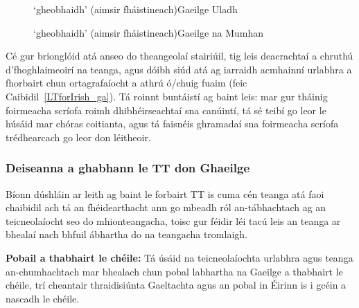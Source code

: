 \begin{multicols}{2}
\begin{description}
\item [{\rm \begin{IPA}j\super jo: i\end{IPA}}]  `gheobhaidh’  (aimsir fháistineach)\newline Gaeilge Uladh
\item [{\rm \begin{IPA}g\super jo: g\super j\end{IPA}} ]  `gheobhaidh’  (aimsir fháistineach)\newline Gaeilge na Mumhan
\end{description}

Cé gur brionglóid atá anseo do theangeolaí stairiúil, tig leis deacrachtaí a chruthú d’fhoghlaimeoirí na teanga, agus dóibh siúd atá ag iarraidh acmhainní urlabhra a fhorbairt chun ortagrafaíocht a athrú ó/chuig fuaim (feic Caibidil~\ref{LTforIrish_ga}).  Tá roinnt buntáistí ag baint leis: mar gur tháinig foirmeacha scríofa roimh dhibhéirseachtaí sna canúintí, tá sé teibí go leor le húsáid mar chóras coitianta, agus tá faisnéis ghramadaí sna foirmeacha scríofa trédhearcach go leor don léitheoir.


\subsubsection{Deiseanna a ghabhann le TT don Ghaeilge}

Bíonn dúshláin ar leith ag baint le forbairt TT is cuma cén teanga atá faoi chaibidil ach tá an fhéidearthacht ann go mbeadh ról an-tábhachtach ag an teicneolaíocht seo do mhionteangacha, toisc gur féidir léi tacú leis an teanga ar bhealaí nach bhfuil ábhartha do na teangacha tromlaigh.

\textbf{Pobail a thabhairt le chéile:} Tá úsáid na teicneolaíochta urlabhra agus teanga an-chumhachtach mar bhealach chun pobal labhartha na Gaeilge a thabhairt le chéile, trí cheantair thraidisiúnta Gaeltachta agus an pobal in Éirinn is i gcéin a nascadh le chéile.


\end{multicols}
